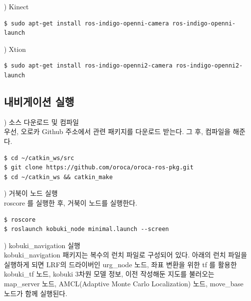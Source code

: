 \vspace{\baselineskip}
\noindent
{}
\thenum) Kinect

\vspace{\baselineskip}
\begin{lstlisting}[language=ROS]
$ sudo apt-get install ros-indigo-openni-camera ros-indigo-openni-launch
\end{lstlisting}


\vspace{\baselineskip}
\noindent
{}
\thenum) Xtion

\vspace{\baselineskip}
\begin{lstlisting}[language=ROS]
$ sudo apt-get install ros-indigo-openni2-camera ros-indigo-openni2-launch
\end{lstlisting}


\subsection{내비게이션 실행}

\setcounter{num}{0}

\vspace{\baselineskip}
\noindent
{}
\thenum) 소스 다운로드 및 컴파일\\
우선, 오로카 Github 주소에서 관련 패키지를 다운로드 받는다. 그 후, 컴파일을 해준다.

\vspace{\baselineskip}
\begin{lstlisting}[language=ROS]
$ cd ~/catkin_ws/src
$ git clone https://github.com/oroca/oroca-ros-pkg.git
$ cd ~/catkin_ws && catkin_make
\end{lstlisting}

\vspace{\baselineskip}
\noindent
{}
\thenum) 거북이 노드 실행\\
roscore 를 실행한 후, 거북이 노드를 실행한다.

\vspace{\baselineskip}
\begin{lstlisting}[language=ROS]
$ roscore
$ roslaunch kobuki_node minimal.launch --screen
\end{lstlisting}

\vspace{\baselineskip}
\noindent
{}
\thenum) kobuki\_navigation 실행\\
kobuki\_navigation 패키지는 복수의 런치 파일로 구성되어 있다. 아래의 런치 파일을 실행하게 되면 LRF의 드라이버인 urg\_node 노드, 좌표 변환을 위한 tf 를 활용한 kobuki\_tf 노드, kobuki 3차원 모델 정보, 이전 작성해둔 지도를 불러오는 map\_server 노드, AMCL(Adaptive Monte Carlo Localization) 노드, move\_base 노드가 함께 실행된다.

